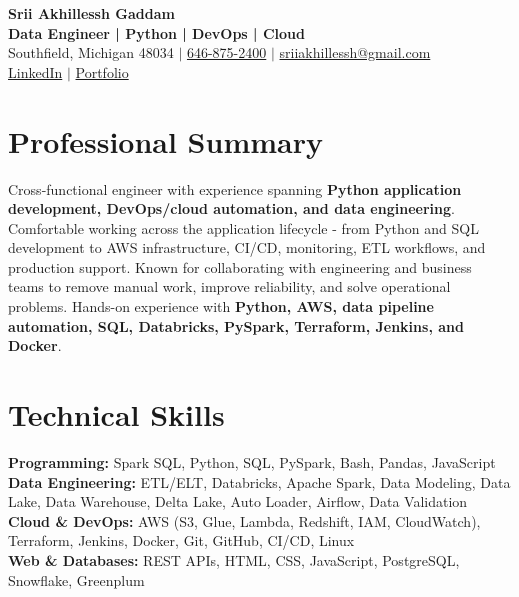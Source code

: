 \documentclass[letterpaper,10pt]{article}
\begin{document}
\fontsize{9.35pt}{10.45pt}\selectfont

\begin{center}
    {\LARGE \textbf{Srii Akhillessh Gaddam}} \\[-1pt]
    \textbf{Data Engineer | Python | DevOps | Cloud} \\[2pt]
    Southfield, Michigan 48034 $|$
    \href{tel:6468752400}{646-875-2400} $|$
    \href{mailto:sriiakhillessh@gmail.com}{sriiakhillessh@gmail.com} \\[1pt]
    \href{https://www.linkedin.com/in/srii-akhiilessh-gaddam-b48668191/}{LinkedIn} $|$
    \href{https://sriiakhillesshg.github.io/portfolio/}{Portfolio}
\end{center}
\vspace{-8pt}

\section{Professional Summary}
\small{Cross-functional engineer with experience spanning \textbf{Python application development, DevOps/cloud automation, and data engineering}. Comfortable working across the application lifecycle - from Python and SQL development to AWS infrastructure, CI/CD, monitoring, ETL workflows, and production support. Known for collaborating with engineering and business teams to remove manual work, improve reliability, and solve operational problems. Hands-on experience with \textbf{Python, AWS, data pipeline automation, SQL, Databricks, PySpark, Terraform, Jenkins, and Docker}.}

\section{Technical Skills}
\small{
\textbf{Programming:} Spark SQL, Python, SQL, PySpark, Bash, Pandas, JavaScript \\
\textbf{Data Engineering:} ETL/ELT, Databricks, Apache Spark, Data Modeling, Data Lake, Data Warehouse, Delta Lake, Auto Loader, Airflow, Data Validation \\
\textbf{Cloud \& DevOps:} AWS (S3, Glue, Lambda, Redshift, IAM, CloudWatch), Terraform, Jenkins, Docker, Git, GitHub, CI/CD, Linux \\
\textbf{Web \& Databases:} REST APIs, HTML, CSS, JavaScript, PostgreSQL, Snowflake, Greenplum
}
\end{document}
